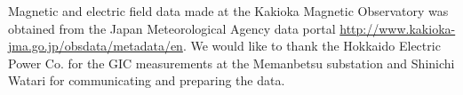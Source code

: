 \documentclass[draft,linenumbers]{agujournal2018}
\begin{document}




\acknowledgments
Magnetic and electric field data made at the Kakioka Magnetic Observatory was obtained from the Japan Meteorological Agency data portal \url{http://www.kakioka-jma.go.jp/obsdata/metadata/en}. We would like to thank the Hokkaido Electric Power Co. for the GIC measurements at the Memanbetsu substation and Shinichi Watari for communicating and preparing the data. 
\end{document}
